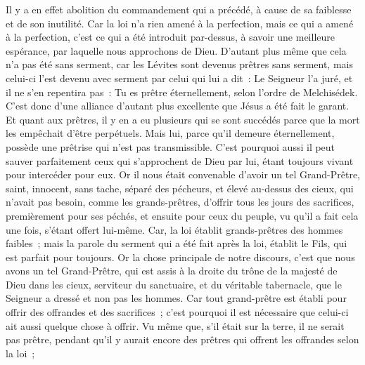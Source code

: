 \begin{multicols}{2}
Il y a en effet abolition du commandement qui a précédé, à cause de sa faiblesse et de son inutilité.
Car la loi n'a rien amené à la perfection, mais ce qui a amené à la perfection, c'est ce qui a été introduit par-dessus, à savoir une meilleure espérance, par laquelle nous approchons de Dieu.
D'autant plus même que cela n'a pas été sans serment,
car les Lévites sont devenus prêtres sans serment, mais celui-ci l'est devenu avec serment par celui qui lui a dit~: Le Seigneur l'a juré, et il ne s'en repentira pas~: Tu es prêtre éternellement, selon l'ordre de Melchisédek.
C'est donc d'une alliance d'autant plus excellente que Jésus a été fait le garant.
Et quant aux prêtres, il y en a eu plusieurs qui se sont succédés parce que la mort les empêchait d'être perpétuels.
Mais lui, parce qu'il demeure éternellement, possède une prêtrise qui n'est pas transmissible.
C'est pourquoi aussi il peut sauver parfaitement ceux qui s'approchent de Dieu par lui, étant toujours vivant pour intercéder pour eux.
Or il nous était convenable d'avoir un tel Grand-Prêtre, saint, innocent, sans tache, séparé des pécheurs, et élevé au-dessus des cieux,
qui n'avait pas besoin, comme les grands-prêtres, d'offrir tous les jours des sacrifices, premièrement pour ses péchés, et ensuite pour ceux du peuple, vu qu'il a fait cela une fois, s'étant offert lui-même.
Car, la loi établit grands-prêtres des hommes faibles~; mais la parole du serment qui a été fait après la loi, établit le Fils, qui est parfait pour toujours.
\VerseOne{}Or la chose principale de notre discours, c'est que nous avons un tel Grand-Prêtre, qui est assis à la droite du trône de la majesté de Dieu dans les cieux,
serviteur du sanctuaire, et du véritable tabernacle, que le Seigneur a dressé et non pas les hommes.
Car tout grand-prêtre est établi pour offrir des offrandes et des sacrifices~; c'est pourquoi il est nécessaire que celui-ci ait aussi quelque chose à offrir.
Vu même que, s'il était sur la terre, il ne serait pas prêtre, pendant qu'il y aurait encore des prêtres qui offrent les offrandes selon la loi~;

\end{multicols}
